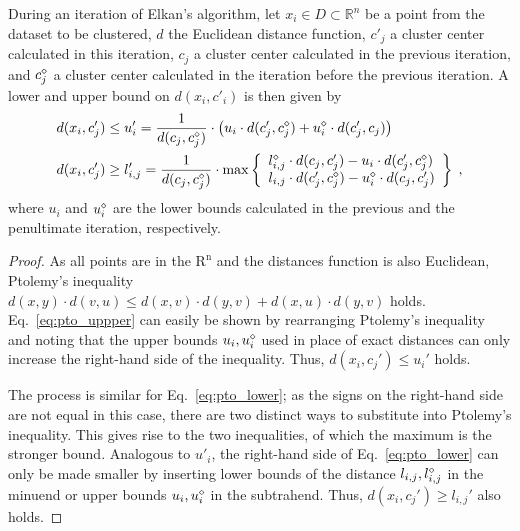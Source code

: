 \begin{theorem}
	During an iteration of Elkan's algorithm,
	let $x_i \in D \subset \mathbb{R}^n$ be a point from the dataset to be clustered,
	$d$ the Euclidean distance function,
	$c'_j$ a cluster center calculated in this iteration,
	$c_j$ a cluster center calculated in the previous iteration, and
	$c^\diamond_j$ a cluster center calculated in the iteration before the previous iteration.
	A lower and upper bound on $d(x_i,c'_i)$ is then given by
	\begin{align}
		\label{eq:pto_upper}
		d(x_i, c_j') & \leq u_i' = \frac{1}{d(c_j, c_j^{\diamond})} \cdot \left( u_i \cdot d(c_j', c_j^{\diamond}) + u_i^{\diamond} \cdot d(c_j', c_j) \right) \\
		\label{eq:pto_lower}
		d(x_i, c_j') & \geq l_{i,j}' = \frac{1}{d(c_j, c_j^{\diamond})} \cdot \max \left\{
		\begin{array}{l}
			l_{i,j}^{\diamond} \cdot d(c_j, c_j') - u_i \cdot d(c_j', c_j^{\diamond}) \\
			l_{i,j} \cdot d(c_j', c_j^{\diamond}) - u_i^{\diamond} \cdot d(c_j, c_j')
		\end{array}
		\right\}\;,
	\end{align}
	where $u_i$ and $u^\diamond_i$ are the lower bounds calculated in the previous and the penultimate iteration, respectively.
\end{theorem}
\begin{proof}
	As all points are in the $\mathrm{R^n}$ and the distances function is also Euclidean, Ptolemy's inequality
	$d(x, y)\cdot d(v, u) \leq d(x, v) \cdot d(y,v) + d(x, u) \cdot d(y, v)$ holds.
	Eq.~\ref{eq:pto_uppper} can easily be shown by rearranging Ptolemy's inequality and
	noting that the upper bounds $u_i, u^\diamond_i$ used in place of exact distances can only increase the right-hand side of the inequality. Thus, $d(x_i, c_j') \leq u_i'$ holds.

	The process is similar for Eq.~\ref{eq:pto_lower}; as the signs on the right-hand side are not equal in this case, there are two distinct ways to substitute into Ptolemy's inequality.
	This gives rise to the two inequalities, of which the maximum is the stronger bound.
	Analogous to $u'_i$, the right-hand side of Eq.~\ref{eq:pto_lower} can only be made smaller by inserting lower bounds of the distance $l_{i,j},l_{i,j}^\diamond$ in the minuend or upper bounds $u_i, u^\diamond_i$ in the subtrahend.
	Thus, $d(x_i, c_j') \geq l_{i,j}'$ also holds.
\end{proof}




